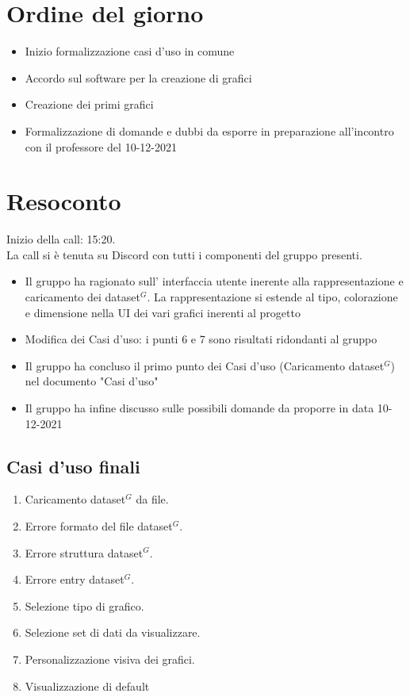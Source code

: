 \section{Ordine del giorno}

\begin{itemize}
	\item Inizio formalizzazione casi d'uso in comune
	\item Accordo sul software per la creazione di grafici
	\item Creazione dei primi grafici
	\item Formalizzazione di domande e dubbi da esporre in preparazione all'incontro con il professore del 10-12-2021
\end{itemize}

\section{Resoconto}

\noindent 
Inizio della call: 15:20. \\
\noindent La call si è tenuta su Discord con tutti i componenti del gruppo presenti.
\begin{itemize}
	\item Il gruppo ha ragionato sull' interfaccia utente inerente alla rappresentazione e caricamento dei dataset$^{G}$. La rappresentazione si estende al tipo, colorazione e dimensione nella UI dei vari grafici inerenti al progetto
	\item Modifica dei Casi d'uso: i punti 6 e 7 sono risultati ridondanti al gruppo
	\item Il gruppo ha concluso il primo punto dei Casi d'uso (Caricamento dataset$^{G}$) nel documento "Casi d'uso"
	\item Il gruppo ha infine discusso sulle possibili domande da proporre in data 10-12-2021
\end{itemize}

\subsection{Casi d'uso finali}
\begin{enumerate}
	\item Caricamento dataset$^{G}$ da file.
	\item Errore formato del file dataset$^{G}$.
	\item Errore struttura dataset$^{G}$.
	\item Errore entry dataset$^{G}$.
	\item Selezione tipo di grafico.
	\item Selezione set di dati da visualizzare.
	\item Personalizzazione visiva dei grafici.
	\item Visualizzazione di default
\end{enumerate}

